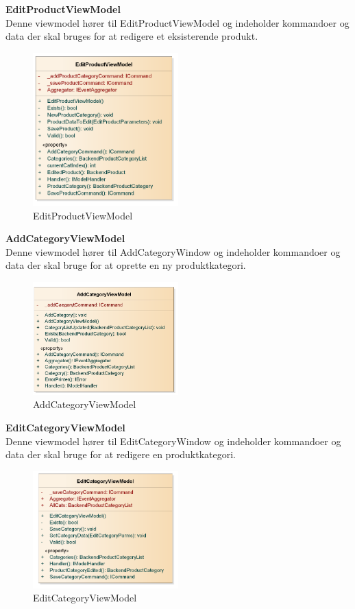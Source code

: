 \textbf{EditProductViewModel}\\
Denne viewmodel hører til EditProductViewModel og indeholder kommandoer og data der skal bruges for at redigere et eksisterende produkt.
\begin{figure}[H]
	\centering
	\includegraphics[width=0.5\textwidth]{Systemdesign/backend/klassebeskrivelser/Images/EditProductVM}
	\caption{EditProductViewModel}
	\label{fig:EditProductViewModel}
\end{figure}
\bigskip

\textbf{AddCategoryViewModel}\\
Denne viewmodel hører til AddCategoryWindow og indeholder kommandoer og data der skal bruge for at oprette en ny produktkategori.
\begin{figure}[H]
	\centering
	\includegraphics[width=0.5\textwidth]{Systemdesign/backend/klassebeskrivelser/Images/AddCategoryVM}
	\caption{AddCategoryViewModel}
	\label{fig:AddCategoryViewModel}
\end{figure}
\bigskip

\textbf{EditCategoryViewModel}\\
Denne viewmodel hører til EditCategoryWindow og indeholder kommandoer og data der skal bruge for at redigere en produktkategori.
\begin{figure}[H]
	\centering
	\includegraphics[width=0.5\textwidth]{Systemdesign/backend/klassebeskrivelser/Images/EditCategoryVM}
	\caption{EditCategoryViewModel}
	\label{fig:EditCategoryViewModel}
\end{figure}
\bigskip

